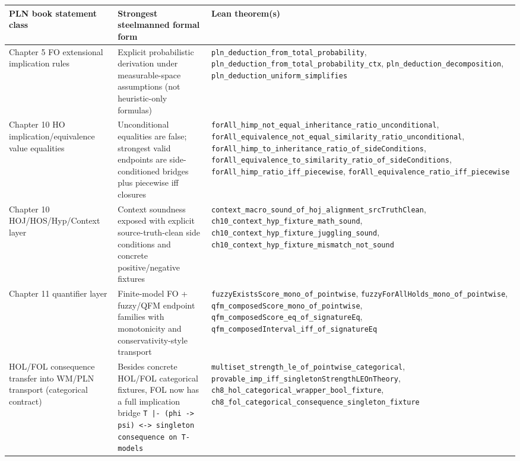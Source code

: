 \documentclass[]{article}
\newcommand{\code}[1]{\texttt{#1}}
\begin{document}
\begin{longtable}{p{}p{}p{}}
\textbf{PLN book statement class} & \textbf{Strongest steelmanned formal form} & \textbf{Lean theorem(s)} \\
\hline
Chapter 5 FO extensional implication rules & Explicit probabilistic derivation under measurable-space assumptions (not heuristic-only formulas) & \code{pln\_deduction\_from\_total\_probability},
\code{pln\_deduction\_from\_total\_probability\_ctx},
\code{pln\_deduction\_decomposition},
\code{pln\_deduction\_uniform\_simplifies} \\
\hline
Chapter 10 HO implication/equivalence value equalities & Unconditional equalities are false; strongest valid endpoints are side-conditioned bridges plus piecewise iff closures & \code{forAll\_himp\_not\_equal\_inheritance\_ratio\_unconditional},
\code{forAll\_equivalence\_not\_equal\_similarity\_ratio\_unconditional},
\code{forAll\_himp\_to\_inheritance\_ratio\_of\_sideConditions},
\code{forAll\_equivalence\_to\_similarity\_ratio\_of\_sideConditions},
\code{forAll\_himp\_ratio\_iff\_piecewise},
\code{forAll\_equivalence\_ratio\_iff\_piecewise} \\
\hline
Chapter 10 HOJ/HOS/Hyp/Context layer & Context soundness exposed with explicit source-truth-clean side conditions and concrete positive/negative fixtures & \code{context\_macro\_sound\_of\_hoj\_alignment\_srcTruthClean},
\code{ch10\_context\_hyp\_fixture\_math\_sound},
\code{ch10\_context\_hyp\_fixture\_juggling\_sound},
\code{ch10\_context\_hyp\_fixture\_mismatch\_not\_sound} \\
\hline
Chapter 11 quantifier layer & Finite-model FO + fuzzy/QFM endpoint families with monotonicity and conservativity-style transport & \code{fuzzyExistsScore\_mono\_of\_pointwise},
\code{fuzzyForAllHolds\_mono\_of\_pointwise},
\code{qfm\_composedScore\_mono\_of\_pointwise},
\code{qfm\_composedScore\_eq\_of\_signatureEq},
\code{qfm\_composedInterval\_iff\_of\_signatureEq} \\
\hline
HOL/FOL consequence transfer into WM/PLN transport (categorical contract) & Besides concrete HOL/FOL categorical fixtures, FOL now has a full implication bridge \code{T |- (phi -> psi) <-> singleton consequence on T-models} & \code{multiset\_strength\_le\_of\_pointwise\_categorical},
\code{provable\_imp\_iff\_singletonStrengthLEOnTheory},
\code{ch8\_hol\_categorical\_wrapper\_bool\_fixture},
\code{ch8\_fol\_categorical\_consequence\_singleton\_fixture} \\
\hline
\end{longtable}
\end{document}
